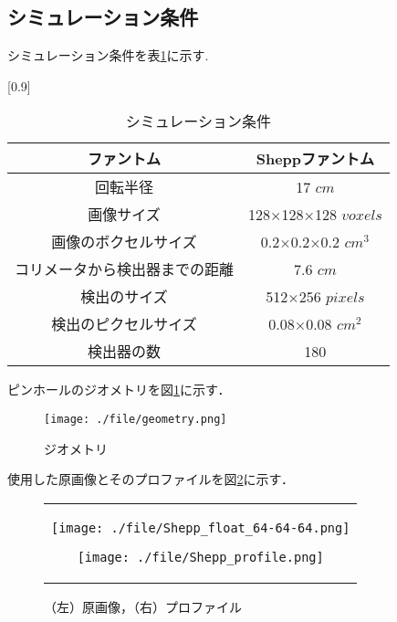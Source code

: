 \documentclass[dvipdfmx,autodetect-engine,twocolumn,10pt]{jsarticle}%
\begin{document}
\subsection{シミュレーション条件}
シミュレーション条件を表\ref{simu_2d}に示す.
\begin{table}[htbp]
  \begin{center}
    \caption{シミュレーション条件}
    \label{simu_2d}
    \small
    \scalebox{0.82}[0.9]
    {
      \begin{tabular}{|c|c|} \hline
        ファントム & Sheppファントム \\ \hline
        回転半径 & 17 $cm$ \\ \hline
        画像サイズ & 128×128×128 $voxels$ \\ \hline
        画像のボクセルサイズ & 0.2×0.2×0.2 $cm^3$ \\ \hline
        コリメータから検出器までの距離 & 7.6 $cm$ \\ \hline
        検出のサイズ & 512×256 $pixels$ \\ \hline
        検出のピクセルサイズ & 0.08×0.08 $cm^2$ \\ \hline
        検出器の数 & 180 \\ \hline
      \end{tabular}
    }
  \end{center}
\end{table}

ピンホールのジオメトリを図\ref{pinhole}に示す．
\begin{figure}[htbp]
  \begin{center}
    \texttt{[image: ./file/geometry.png]}\\
    \caption{ジオメトリ}
    \label{pinhole}
  \end{center}
\end{figure}

使用した原画像とそのプロファイルを図\ref{original_img}に示す．
\begin{figure}[htbp]
  \begin{center}
    \begin{tabular}{c}

      \begin{minipage}{0.5\hsize}
        \begin{center}
          \texttt{[image: ./file/Shepp\_float\_64-64-64.png]}
        \end{center}
      \end{minipage}

      \begin{minipage}{0.5\hsize}
        \begin{center}
          \texttt{[image: ./file/Shepp\_profile.png]}
        \end{center}
      \end{minipage}

    \end{tabular}
  \caption{（左）原画像，（右）プロファイル}
  \label{original_img}
  \end{center}
\end{figure}
\end{document}
